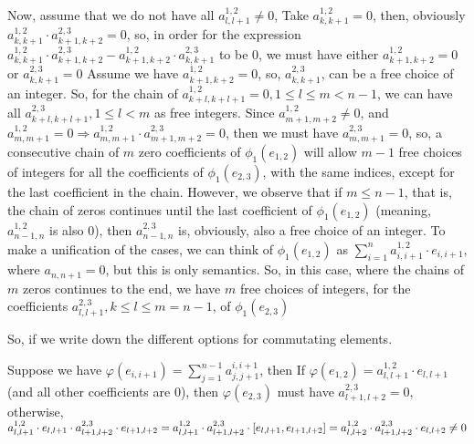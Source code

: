 \documentclass[12pt]{article}
\begin{document}
Now, assume that we do not have all $a_{l,l+1}^{1,2} \neq 0$, \newline
Take $a_{k,k+1}^{1,2}=0$, then, obviously $a_{k,k+1}^{1,2} \cdot a_{k+1,k+2}^{2,3}=0$, \newline
so, in order for the expression $a_{k,k+1}^{1,2} \cdot a_{k+1,k+2}^{2,3}-a_{k+1,k+2}^{1,2} \cdot a_{k,k+1}^{2,3}$ to be $0$, we must have either $a_{k+1,k+2}^{1,2}=0$ or $a_{k,k+1}^{2,3}=0$ \newline
Assume we have $a_{k+1,k+2}^{1,2}=0$, so, $a_{k,k+1}^{2,3}$, can be a free choice of an integer. \newline
So, for the chain of $a_{k+l,k+l+1}^{1,2}=0, 1 \leq l \leq m < n-1$, we can have all $a_{k+l,k+l+1}^{2,3}, 1 \leq l < m$ as free integers. Since $a_{m+1,m+2}^{1,2} \neq 0$, \newline
and $a_{m,m+1}^{1,2}=0 \Rightarrow a_{m,m+1}^{1,2} \cdot a_{m+1,m+2}^{2,3}=0$, then we must have $a_{m,m+1}^{2,3}=0$, so, a consecutive chain of $m$ zero coefficients of $\phi_1(e_{1,2})$ will allow $m-1$ free choices of integers for all the coefficients of $\phi_1(e_{2,3})$, with the same indices, except for the last coefficient in the chain. \newline
However, we observe that if $m \leq n-1$, that is, the chain of zeros continues until the last coefficient of $\phi_1(e_{1,2})$ (meaning, $a_{n-1,n}^{1,2}$ is also $0$), then $a_{n-1,n}^{2,3}$ is, obviously, also a free choice of an integer. To make a unification of the cases, we can think of $\phi_1(e_{1,2})$ as $\sum_{i=1}^n a_{i,i+1}^{1,2} \cdot e_{i,i+1}$, where $a_{n,n+1}=0$, but this is only semantics. \newline
So, in this case, where the chains of $m$ zeros continues to the end, we have $m$ free choices of integers, for the coefficients $a_{l,l+1}^{2,3}, k \leq l \leq m = n-1$, \newline
of $\phi_1(e_{2,3})$

So, if we write down the different options for commutating elements.

Suppose we have $\varphi(e_{i,i+1})=\sum_{j=1}^{n-1} a_{j,j+1}^{i,i+1}$, then \newline
If $\varphi(e_{1,2})=a_{l,l+1}^{1,2} \cdot e_{l,l+1}$ (and all other coefficients are $0$), \newline 
then $\varphi(e_{2,3})$ must have $a_{l+1,l+2}^{2,3}=0$, otherwise, $a_{l,l+1}^{1,2} \cdot e_{l,l+1} \cdot a_{l+1,l+2}^{2,3} \cdot e_{l+1,l+2}= \newline
a_{l,l+1}^{1,2} \cdot a_{l+1,l+2}^{2,3} \cdot [e_{l,l+1},e_{l+1,l+2}]=a_{l,l+2}^{1,2} \cdot a_{l+1,l+2}^{2,3} \cdot e_{l,l+2} \neq 0$ \newline
\end{document}
